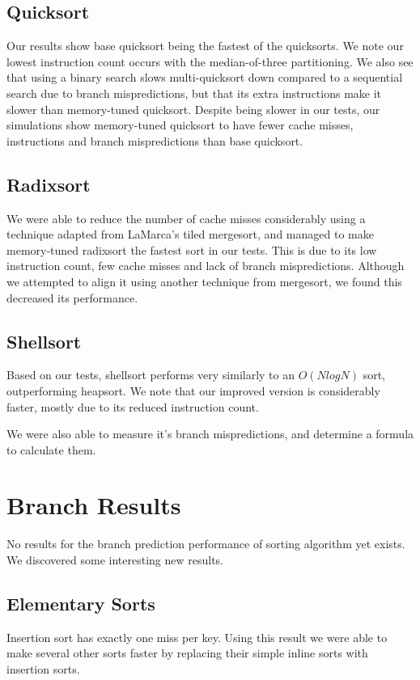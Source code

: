 \subsection{Quicksort}

Our results show base quicksort being the fastest of the quicksorts. We note our
lowest instruction count occurs with the median-of-three partitioning. We also
see that using a binary search slows multi-quicksort down compared to a
sequential search due to branch mispredictions, but that its extra instructions
make it slower than memory-tuned quicksort. Despite being slower in our tests,
our simulations show memory-tuned quicksort to have fewer cache misses,
instructions and branch mispredictions than base quicksort.

\subsection{Radixsort}

We were able to reduce the number of cache misses considerably using a technique
adapted from LaMarca's tiled mergesort, and managed to make memory-tuned radixsort the
fastest sort in our tests. This is due to its low instruction count, few cache
misses and lack of branch mispredictions. Although we attempted to align it
using another technique from mergesort, we found this decreased its performance.

\subsection{Shellsort}

Based on our tests, shellsort performs very similarly to an $O(NlogN)$ sort,
outperforming heapsort. We note that our improved version is considerably
faster, mostly due to its reduced instruction count.

We were also able to measure it's branch mispredictions, and determine a formula
to calculate them.

\section{Branch Results}

No results for the branch prediction performance of sorting algorithm yet
exists. We discovered some interesting new results.

\subsection{Elementary Sorts}
Insertion sort has exactly one miss per key. Using this result we were able to
make several other sorts faster by replacing their simple inline sorts with
insertion sorts.

